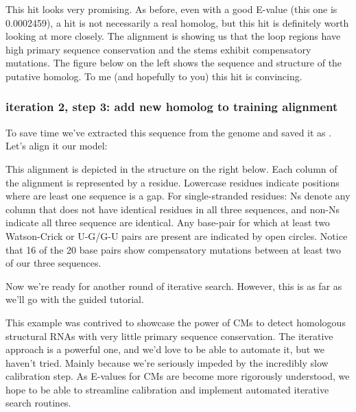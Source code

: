 This hit looks very promising. As before, even with a good E-value
(this one is 0.0002459), a hit is not necessarily a real homolog, but
this hit is definitely worth looking at more closely. The
 alignment is showing us that the loop regions have
high primary sequence conservation and the stems exhibit
compensatory mutations. The figure below on the left shows the
sequence and structure of the putative homolog. To me (and hopefully to you) this
hit is convincing. 

\subsubsection{iteration 2, step 3: add new homolog to training alignment}
To save time we've extracted this sequence from the genome and saved
it as . Let's align it our model:


This alignment is depicted in the structure on the right
below. Each column of the alignment is represented by a
residue. Lowercase residues indicate positions where are least one
sequence is a gap.  For single-stranded residues: Ns denote any
column that does  not have identical residues in all three sequences,
and non-Ns indicate all three sequence are identical. Any base-pair
for which at least two Watson-Crick or U-G/G-U pairs are present are
indicated by open circles. Notice that 16 of the 20 base pairs show
compensatory mutations between at least two of our three sequences. 

Now we're ready for another round of iterative search. However, this
is as far as we'll go with the guided tutorial. 

This example was contrived to showcase the power of CMs to detect
homologous structural RNAs with very little primary sequence
conservation. The iterative approach is a powerful one, and we'd love
to be able to automate it, but we haven't tried. Mainly because we're
seriously impeded by the incredibly slow calibration step. As E-values
for CMs are become more rigorously understood, we hope to be able to
streamline calibration and implement automated iterative search
routines. 

